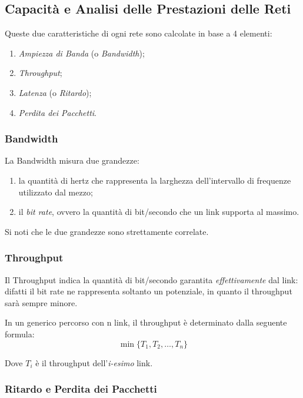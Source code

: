 \documentclass[a4paper]{article}
\begin{document}
	\subsection{Capacità e Analisi delle Prestazioni delle Reti}
	
		Queste due caratteristiche di ogni rete sono calcolate in base a 4 elementi:
		\begin{enumerate}
			\item \emph{Ampiezza di Banda} (o \emph{Bandwidth});
			\item \emph{Throughput};
			\item \emph{Latenza} (o \emph{Ritardo});
			\item \emph{Perdita dei Pacchetti}.
		\end{enumerate}
		
		\subsubsection{Bandwidth}
		
			La Bandwidth misura due grandezze:
			\begin{enumerate}
				\item la quantità di hertz che rappresenta la larghezza dell'intervallo di frequenze utilizzato dal mezzo;
				\item il \emph{bit rate}, ovvero la quantità di bit/secondo che un link supporta al massimo.
			\end{enumerate}
			Si noti che le due grandezze sono strettamente correlate.
			
		\subsubsection{Throughput}
			
			Il Throughput indica la quantità di bit/secondo garantita \emph{effettivamente} dal link: difatti il bit rate ne rappresenta soltanto un potenziale, in quanto il throughput sarà sempre minore.
			
			In un generico percorso con n link, il throughput è determinato dalla seguente formula:
			\[ \min\{T_1, T_2, \dots, T_n\} \]
			
			Dove $ T_{i} $ è il throughput dell'\emph{i-esimo} link.
			
		\subsubsection{Ritardo e Perdita dei Pacchetti}
		
\end{document}
